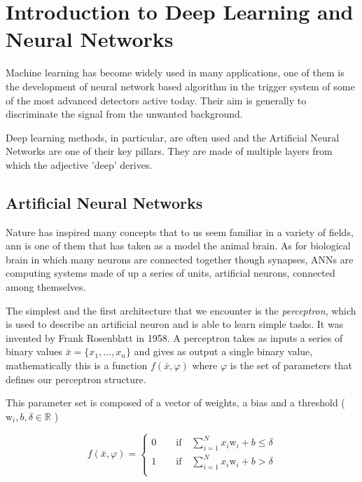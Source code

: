 \documentclass[../../main.tex]{subfiles}
\begin{document}
\chapter{Introduction to Deep Learning and Neural Networks}
\label{sec:NN_int}
Machine learning has become widely used in many applications, one of them is the development of neural network based algorithm in the trigger system of some of the most advanced detectors active today. Their aim is generally to discriminate the signal from the unwanted background.  
    
Deep learning methods, in particular, are often used and the Artificial Neural Networks are one of their key pillars. They are made of multiple layers from which the adjective ’deep’ derives. 
    
\section{Artificial Neural Networks}
\label{sec:ANN}
Nature has inspired many concepts that to us seem familiar in a variety of fields, \acrfull{ann} is one of them that has taken as a model the animal brain. As for biological brain in which many neurons are connected together though synapses, ANNs are computing systems made of up a series of units, artificial neurons, connected among themselves.  
    
The simplest and the first architecture that we encounter is the \textit{perceptron}, which is used to describe an artificial neuron and is able to learn simple tasks. It was invented by Frank Rosenblatt in 1958\cite{perceptron}. A perceptron takes as inputs a series of binary values $\bar{x}=\{x_1, \dots , x_n\}$ and gives as output a single binary value, mathematically this is a function $f(\bar{x},\varphi)$ where $\varphi$ is the set of parameters that defines our perceptron structure.  
    
This parameter set is composed of a vector of weights, a bias and a threshold ( $\text{w}_i,b, \delta \in \mathbb{R}$ )
    
\begin{equation}
    f(\bar{x},\varphi) = 
    \begin{cases}
    0\qquad\text{if}\quad\sum_{i=1}^N x_i \text{w}_i + b \leq \delta \\
    1\qquad\text{if}\quad\sum_{i=1}^N x_i \text{w}_i + b > \delta \\
    \end{cases}
\end{equation}
\end{document}
